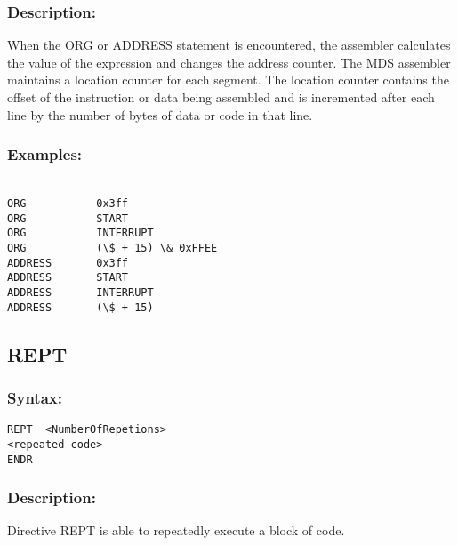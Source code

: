 {        \subsubsection{Description:}
        When the ORG or ADDRESS statement is encountered, the assembler calculates the value of the expression and changes the address counter. The MDS assembler maintains a location counter for each segment. The location counter contains the offset of the instruction or data being assembled and is incremented after each line by the number of bytes of data or code in that line.

        \subsubsection{Examples:}
        {
            ~\\
            \usecodefont
            \verb'ORG           0x3ff'\\
            \verb'ORG           START'\\
            \verb'ORG           INTERRUPT'\\
            \verb'ORG           (\$ + 15) \& 0xFFEE'\\

            \verb'ADDRESS       0x3ff'\\
            \verb'ADDRESS       START'\\
            \verb'ADDRESS       INTERRUPT'\\
            \verb'ADDRESS       (\$ + 15)'\\
        }
    \subsection{REPT}
        \subsubsection{Syntax:}
            \verb'REPT  <NumberOfRepetions>'\\
            \verb'<repeated code>'\\
            \verb'ENDR'

        \subsubsection{Description:}
            Directive REPT is able to repeatedly execute a block of code.

}

